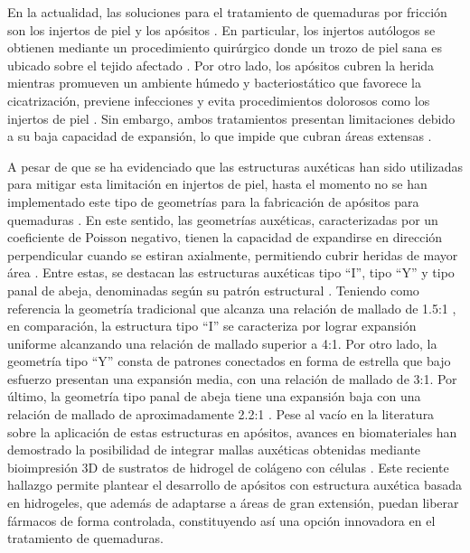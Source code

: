 \documentclass[../../DocumentoCompleto.tex]{subfiles}
\begin{document}
En la actualidad, las soluciones para el tratamiento de quemaduras por fricción son los injertos de piel y los apósitos \cite{Suca2024}. En particular, los injertos autólogos se obtienen mediante un procedimiento quirúrgico donde un trozo de piel sana es ubicado sobre el tejido afectado \cite{Bogdanov2021}. Por otro lado, los apósitos cubren la herida mientras promueven un ambiente húmedo y bacteriostático que favorece la cicatrización, previene infecciones y evita procedimientos dolorosos como los injertos de piel \cite{Aderibigbe2018}. Sin embargo, ambos tratamientos presentan limitaciones debido a su baja capacidad de expansión, lo que impide que cubran áreas extensas \cite{Gupta2023}.

A pesar de que se ha evidenciado que las estructuras auxéticas han sido utilizadas para mitigar esta limitación en injertos de piel, hasta el momento no se han implementado este tipo de geometrías para la fabricación de apósitos para quemaduras \cite{Gupta2023}. En este sentido, las geometrías auxéticas, caracterizadas por un coeficiente de Poisson negativo, tienen la capacidad de expandirse en dirección perpendicular cuando se estiran axialmente, permitiendo cubrir heridas de mayor área \cite{Dou2023}. Entre estas, se destacan las estructuras auxéticas tipo ``I'', tipo ``Y'' y tipo panal de abeja, denominadas según su patrón estructural \cite{GuptaChanda2023}. Teniendo como referencia la geometría tradicional que alcanza una relación de mallado de 1.5:1 \cite{GuptaChanda2023}, en comparación, la estructura tipo ``I'' se caracteriza por lograr expansión uniforme alcanzando una relación de mallado superior a 4:1. Por otro lado, la geometría tipo ``Y'' consta de patrones conectados en forma de estrella que bajo esfuerzo presentan una expansión media, con una relación de mallado de 3:1. Por último, la geometría tipo panal de abeja tiene una expansión baja con una relación de mallado de aproximadamente 2.2:1 \cite{Gupta2023}. Pese al vacío en la literatura sobre la aplicación de estas estructuras en apósitos, avances en biomateriales han demostrado la posibilidad de integrar mallas auxéticas obtenidas mediante bioimpresión 3D de sustratos de hidrogel de colágeno con células \cite{Wei2025}. Este reciente hallazgo permite plantear el desarrollo de apósitos con estructura auxética basada en hidrogeles, que además de adaptarse a áreas de gran extensión, puedan liberar fármacos de forma controlada, constituyendo así una opción innovadora en el tratamiento de quemaduras.
\end{document}
